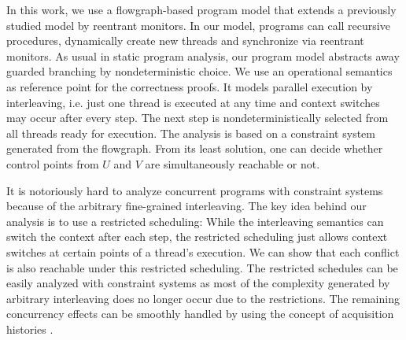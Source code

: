 \documentclass[11pt,a4paper]{article}
\begin{document}
  In this work, we use a flowgraph-based program model that extends a previously studied model \cite{LM07} by reentrant monitors.
  In our model, programs can call recursive procedures, dynamically create new threads and synchronize 
  via reentrant monitors. As usual in static program analysis, our program model abstracts away guarded branching by nondeterministic choice. We use an operational semantics as reference point for the correctness proofs.
  It models parallel execution by interleaving, i.e. just one thread is executed at any time and context switches may occur after every step. The next step is nondeterministically selected from all threads ready for execution.
  The analysis is based on a constraint system generated from the flowgraph. From its least solution, one can decide whether control points from $U$ and $V$ are simultaneously reachable or not. 

  It is notoriously hard to analyze concurrent programs with constraint systems because of the arbitrary fine-grained interleaving.
  The key idea behind our analysis is to use a restricted scheduling: While the interleaving semantics can switch the context after each step, the restricted scheduling just allows context switches at certain points of a thread's
  execution. We can show that each conflict is also reachable under this restricted scheduling. The restricted schedules can be easily analyzed with constraint systems as most of the complexity generated by arbitrary interleaving 
  does no longer occur due to the restrictions. The remaining concurrency effects can be smoothly handled by using the concept of acquisition histories \cite{KIG05}.
\end{document}
